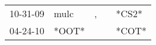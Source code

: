 \begin{supertabular}{lllll}
 10-31-09 &   mulc &  , &   &  *CS2* \\
 04-24-10 &  *OOT* &    &   &  *COT* \\
\end{supertabular}
